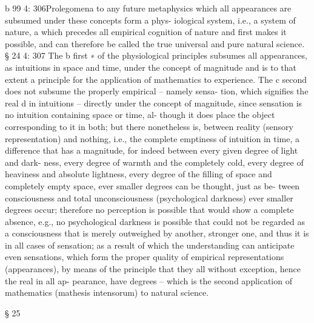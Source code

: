 b
99
4: 306Prolegomena to any future metaphysics
which all appearances are subsumed under these concepts form a phys-
iological system, i.e., a system of nature, a which precedes all empirical
cognition of nature and ﬁrst makes it possible, and can therefore be called
the true universal and pure natural science.
§ 24
4: 307
The b ﬁrst ∗ of the physiological principles subsumes all appearances, as
intuitions in space and time, under the concept of magnitude and is to
that extent a principle for the application of mathematics to experience.
The c second does not subsume the properly empirical – namely sensa-
tion, which signiﬁes the real d in intuitions – directly under the concept
of magnitude, since sensation is no intuition containing space or time, al-
though it does place the object corresponding to it in both; but there
nonetheless is, between reality (sensory representation) and nothing,
i.e., the complete emptiness of intuition in time, a difference that has
a magnitude, for indeed between every given degree of light and dark-
ness, every degree of warmth and the completely cold, every degree of
heaviness and absolute lightness, every degree of the ﬁlling of space and
completely empty space, ever smaller degrees can be thought, just as be-
tween consciousness and total unconsciousness (psychological darkness)
ever smaller degrees occur; therefore no perception is possible that would
show a complete absence, e.g., no psychological darkness is possible that
could not be regarded as a consciousness that is merely outweighed by
another, stronger one, and thus it is in all cases of sensation; as a result
of which the understanding can anticipate even sensations, which form
the proper quality of empirical representations (appearances), by means
of the principle that they all without exception, hence the real in all ap-
pearance, have degrees – which is the second application of mathematics
(mathesis intensorum) to natural science.

§ 25

